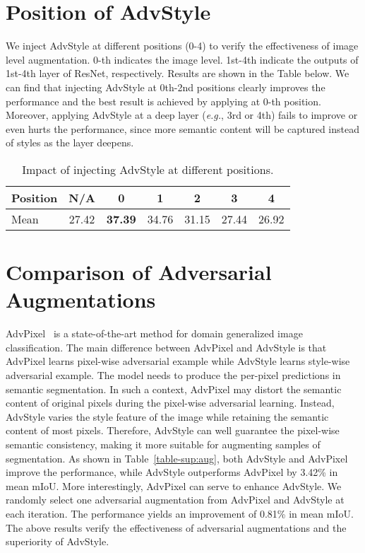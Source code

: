 \documentclass{article}
\newcommand{\ours}{AdvStyle\xspace}
\begin{document}
\section{Position of AdvStyle}
We inject \ours at different positions (0-4) to verify the effectiveness of image level augmentation. 0-th indicates the image level. 1st-4th indicate the outputs of 1st-4th layer of ResNet, respectively. Results are shown in the Table below.
We can find that injecting \ours at 0th-2nd positions clearly improves the performance and the best result is achieved by applying at 0-th position. Moreover, applying \ours at a deep layer (\textit{e.g.}, 3rd or 4th) fails to improve or even hurts the performance, since more semantic content will be captured instead of styles as the layer deepens.
\begin{table}[h]
\centering
\footnotesize
\caption{Impact of injecting \ours at different positions.} 
\setlength{\tabcolsep}{3pt}
\begin{tabular}{l|c|c|c|c|c|c}
\toprule
Position & N/A &  0 & 1 & 2 & 3 & 4 \\
\midrule
Mean & 27.42 &  \bf 37.39 & 34.76 & 31.15 & 27.44 & 26.92\\
\bottomrule
\end{tabular}
\label{table:position}
\end{table}



\section{Comparison of Adversarial Augmentations}
AdvPixel~\cite{volpi2018generalizing} is a state-of-the-art method for domain generalized image classification. The main difference between AdvPixel and \ours is that AdvPixel learns pixel-wise adversarial example while \ours learns style-wise adversarial example. 
The model needs to produce the per-pixel predictions in semantic segmentation. In such a context, AdvPixel may distort the semantic content of original pixels during the pixel-wise adversarial learning. Instead, \ours varies the style feature of the image while retaining the semantic content of most pixels. Therefore, \ours can well guarantee the pixel-wise semantic consistency, making it more suitable for augmenting samples of segmentation. 
As shown in Table~\ref{table-sup:aug}, both \ours and AdvPixel improve the performance, while \ours outperforms AdvPixel by 3.42\% in mean mIoU. More interestingly, AdvPixel can serve to enhance \ours. We randomly select one adversarial augmentation from AdvPixel and \ours at each iteration. The performance yields an improvement of 0.81\% in mean mIoU. The above results verify the effectiveness of adversarial augmentations and the superiority of \ours.
\end{document}
